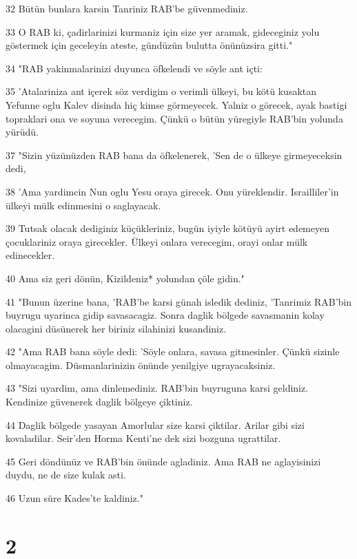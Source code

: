 \par 32 Bütün bunlara karsin Tanriniz RAB'be güvenmediniz.
\par 33 O RAB ki, çadirlarinizi kurmaniz için size yer aramak, gideceginiz yolu göstermek için geceleyin ateste, gündüzün bulutta önünüzsira gitti."
\par 34 "RAB yakinmalarinizi duyunca öfkelendi ve söyle ant içti:
\par 35 'Atalariniza ant içerek söz verdigim o verimli ülkeyi, bu kötü kusaktan Yefunne oglu Kalev disinda hiç kimse görmeyecek. Yalniz o görecek, ayak bastigi topraklari ona ve soyuna verecegim. Çünkü o bütün yüregiyle RAB'bin yolunda yürüdü.
\par 37 "Sizin yüzünüzden RAB bana da öfkelenerek, 'Sen de o ülkeye girmeyeceksin dedi,
\par 38 'Ama yardimcin Nun oglu Yesu oraya girecek. Onu yüreklendir. Israilliler'in ülkeyi mülk edinmesini o saglayacak.
\par 39 Tutsak olacak dediginiz küçükleriniz, bugün iyiyle kötüyü ayirt edemeyen çocuklariniz oraya girecekler. Ülkeyi onlara verecegim, orayi onlar mülk edinecekler.
\par 40 Ama siz geri dönün, Kizildeniz* yolundan çöle gidin."
\par 41 "Bunun üzerine bana, 'RAB'be karsi günah isledik dediniz, 'Tanrimiz RAB'bin buyrugu uyarinca gidip savasacagiz. Sonra daglik bölgede savasmanin kolay olacagini düsünerek her biriniz silahinizi kusandiniz.
\par 42 "Ama RAB bana söyle dedi: 'Söyle onlara, savasa gitmesinler. Çünkü sizinle olmayacagim. Düsmanlarinizin önünde yenilgiye ugrayacaksiniz.
\par 43 "Sizi uyardim, ama dinlemediniz. RAB'bin buyruguna karsi geldiniz. Kendinize güvenerek daglik bölgeye çiktiniz.
\par 44 Daglik bölgede yasayan Amorlular size karsi çiktilar. Arilar gibi sizi kovaladilar. Seir'den Horma Kenti'ne dek sizi bozguna ugrattilar.
\par 45 Geri döndünüz ve RAB'bin önünde agladiniz. Ama RAB ne aglayisinizi duydu, ne de size kulak asti.
\par 46 Uzun süre Kades'te kaldiniz."

\chapter{2}

